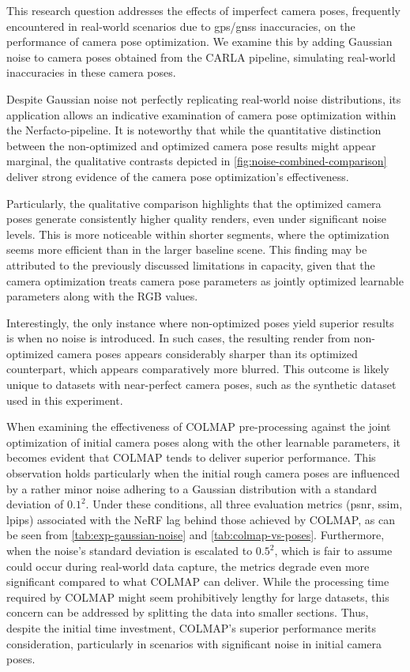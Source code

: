 This research question addresses the effects of imperfect camera poses, frequently encountered in real-world scenarios due to \acrshort{gps}/\acrshort{gnss} inaccuracies, on the performance of camera pose optimization. We examine this by adding Gaussian noise to camera poses obtained from the CARLA pipeline, simulating real-world inaccuracies in these camera poses.

Despite Gaussian noise not perfectly replicating real-world noise distributions, its application allows an indicative examination of camera pose optimization within the Nerfacto-pipeline. It is noteworthy that while the quantitative distinction between the non-optimized and optimized camera pose results might appear marginal, the qualitative contrasts depicted in \autoref{fig:noise-combined-comparison} deliver strong evidence of the camera pose optimization's effectiveness.

Particularly, the qualitative comparison highlights that the optimized camera poses generate consistently higher quality renders, even under significant noise levels. This is more noticeable within shorter segments, where the optimization seems more efficient than in the larger baseline scene. This finding may be attributed to the previously discussed limitations in capacity, given that the camera optimization treats camera pose parameters as jointly optimized learnable parameters along with the RGB values.

Interestingly, the only instance where non-optimized poses yield superior results is when no noise is introduced. In such cases, the resulting render from non-optimized camera poses appears considerably sharper than its optimized counterpart, which appears comparatively more blurred. This outcome is likely unique to datasets with near-perfect camera poses, such as the synthetic dataset used in this experiment.


When examining the effectiveness of COLMAP pre-processing against the joint optimization of initial camera poses along with the other learnable parameters, it becomes evident that COLMAP tends to deliver superior performance. This observation holds particularly when the initial rough camera poses are influenced by a rather minor noise adhering to a Gaussian distribution with a standard deviation of $0.1^2$. Under these conditions, all three evaluation metrics (\acrshort{psnr}, \acrshort{ssim}, \acrshort{lpips}) associated with the NeRF lag behind those achieved by COLMAP, as can be seen from \autoref{tab:exp-gaussian-noise} and \autoref{tab:colmap-vs-poses}. Furthermore, when the noise's standard deviation is escalated to $0.5^2$, which is fair to assume could occur during real-world data capture, the metrics degrade even more significant compared to what COLMAP can deliver. While the processing time required by COLMAP might seem prohibitively lengthy for large datasets, this concern can be addressed by splitting the data into smaller sections. Thus, despite the initial time investment, COLMAP's superior performance merits consideration, particularly in scenarios with significant noise in initial camera poses.

